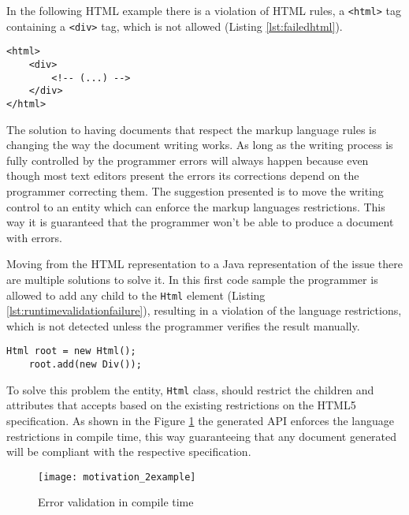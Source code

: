 In the following \ac{HTML} example there is a violation of \ac{HTML} rules, a \texttt{<html>} tag containing a \texttt{<div>} tag, which is not allowed (Listing \ref{lst:failedhtml}).

\bigskip

\lstset{language=HTML}

\begin{lstlisting}[caption={Failed HTML rule validation},captionpos=b,label={lst:failedhtml}]
<html>
    <div>
        <!-- (...) -->
    </div>
</html>
\end{lstlisting}

\noindent
The solution to having documents that respect the markup language rules is changing the way the document writing works. As long as the writing process is fully controlled by the programmer errors will always happen because even though most text editors present the errors its corrections depend on the programmer correcting them. The suggestion presented is to move the writing control to an entity which can enforce the markup languages restrictions. This way it is guaranteed that the programmer won't be able to produce a document with errors. 

\noindent
Moving from the \ac{HTML} representation to a Java representation of the issue there are multiple solutions to solve it. In this first code sample the programmer is allowed to add any child to the \texttt{Html} element (Listing \ref{lst:runtimevalidationfailure}), resulting in a violation of the language restrictions, which is not detected unless the programmer verifies the result manually.

\bigskip


\begin{lstlisting}[caption={Lack of rule validation},captionpos=b,label={lst:runtimevalidationfailure}]
	Html root = new Html();
	root.add(new Div());
\end{lstlisting}

\noindent
To solve this problem the entity, \texttt{Html} class, should restrict the children and attributes that accepts based on the existing restrictions on the \ac{HTML}5 specification. As shown in the Figure \ref{motivation_2example} the generated \ac{API} enforces the language restrictions in compile time, this way guaranteeing that any document generated will be compliant with the respective specification.

\begin{figure}[h]
	\centering
	\texttt{[image: motivation\_2example]}
	\caption{Error validation in compile time}
	\label{motivation_2example}
\end{figure}

